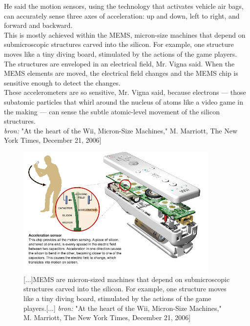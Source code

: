 \documentclass[11pt]{article}
\begin{document}
He said the motion sensors, using the technology that activates vehicle air bags, can accurately sense three axes of acceleration: up and down, left to right, and forward and backward. \\

This is mostly achieved within the MEMS, micron-size machines that depend on submicroscopic structures carved into the silicon. For example, one structure moves like a tiny diving board, stimulated by the actions of the game players.\\
 
The structures are enveloped in an electrical field, Mr. Vigna said. When the MEMS elements are moved, the electrical field changes and the MEMS chip is sensitive enough to detect the changes. \\

These accelerometers are so sensitive, Mr. Vigna said, because electrons --- those subatomic particles that whirl around the nucleus of atoms like a video game in the making --- can sense the subtle atomic-level movement of the silicon structures.\\

\textit{bron:} "At the heart of the Wii, Micron-Size Machines," M. Marriott, The New York Times, December 21, 2006]

\begin{figure}
\begin{center}
\includegraphics[width=10cm]{newYorkTimesWiiController03.jpg}
\caption{[...]MEMS are micron-sized machines that depend on submicroscopic structures carved into the silicon. For example, one structure moves like a tiny diving board, stimulated by the actions of the game players.[...] \textit{bron:} "At the heart of the Wii, Micron-Size Machines," M. Marriott, The New York Times, December 21, 2006]}
\end{center}
\end{figure}
\end{document}
